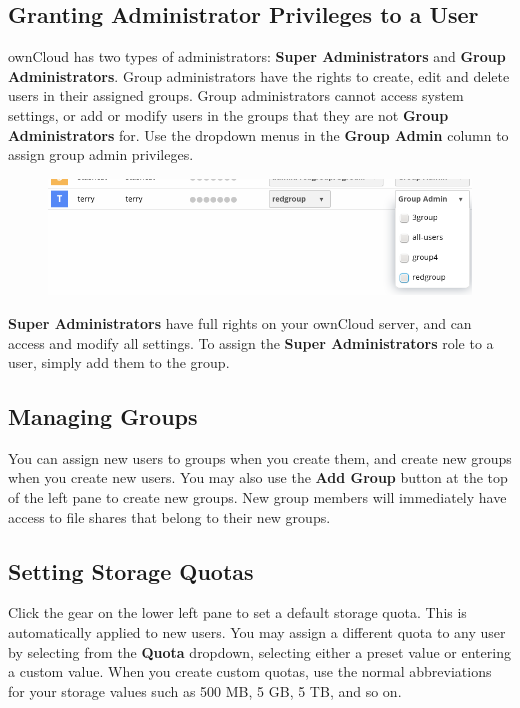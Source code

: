 \documentclass[letterpaper,10pt,english]{sphinxmanual}
\begin{document}
\subsection{Granting Administrator Privileges to a User}
\label{configuration_user/user_configuration:granting-administrator-privileges-to-a-user}
ownCloud has two types of administrators: \textbf{Super Administrators} and \textbf{Group
Administrators}. Group administrators have the rights to create, edit and
delete users in their assigned groups. Group administrators cannot access
system settings, or add or modify users in the groups that they are not \textbf{Group
Administrators} for. Use the dropdown menus in the \textbf{Group Admin} column to
assign group admin privileges.
\begin{figure}[htbp]
\centering

\includegraphics{users-groups.png}
\end{figure}

\textbf{Super Administrators} have full rights on your ownCloud server, and can
access and modify all settings. To assign the \textbf{Super Administrators} role to
a user, simply add them to the  group.


\subsection{Managing Groups}
\label{configuration_user/user_configuration:managing-groups}
You can assign new users to groups when you create them, and create new groups
when you create new users. You may also use the \textbf{Add Group} button at the top
of the left pane to create new groups. New group members will immediately
have access to file shares that belong to their new groups.


\subsection{Setting Storage Quotas}
\label{configuration_user/user_configuration:setting-storage-quotas}
Click the gear on the lower left pane to set a default storage quota. This is
automatically applied to new users. You may assign a different quota to any user
by selecting from the \textbf{Quota} dropdown, selecting either a preset value or
entering a custom value. When you create custom quotas, use the normal
abbreviations for your storage values such as 500 MB, 5 GB, 5 TB, and so on.
\end{document}

